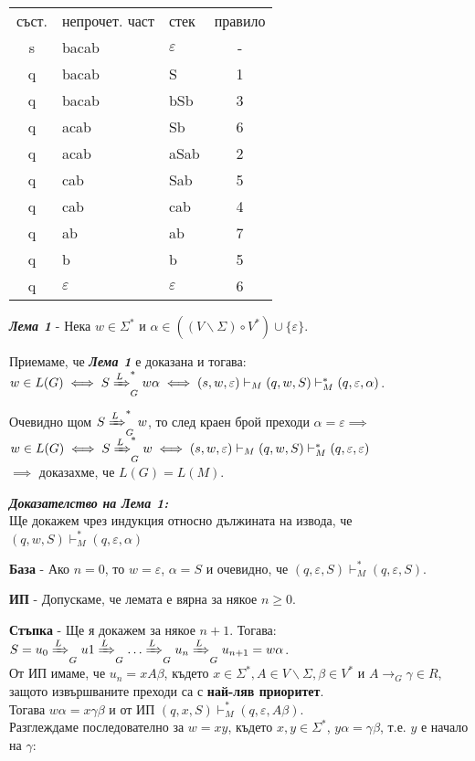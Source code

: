 \documentclass[fleqn,12pt]{article}
\begin{document}
\begin{flushleft}
\begin{tabular}{ |c|l|l|c| } 
\hline
съст. & непрочет. част & стек & правило \\ 
s & bacab & $\varepsilon$ & - \\
q & bacab & S & 1 \\
q & bacab & bSb & 3 \\
q & acab & Sb & 6 \\
q & acab & aSab & 2 \\
q & cab & Sab & 5 \\
q & cab & cab & 4 \\
q & ab & ab & 7 \\
q & b & b & 5 \\
q & $\varepsilon$ & $\varepsilon$ & 6 \\
\hline
\end{tabular}

\textit{\textbf{Лема 1}} - Нека $w \in \Sigma^*$ и $\alpha \in ((V \backslash \Sigma) \circ V^*) \cup \{\varepsilon\}$. 

Приемаме, че \textit{\textbf{Лема 1}} е доказана и тогава: \\
$w \in L(G) \iff S \xRightarrow[]{L}_G^* w\alpha \iff (s, w, \varepsilon) \vdash_M (q, w, S) \vdash_M^* (q, \varepsilon, \alpha)$.

Очевидно щом $S \xRightarrow[]{L}_G^* w$, то след краен брой преходи $\alpha = \varepsilon \implies$ \\
$w \in L(G) \iff S \xRightarrow[]{L}_G^* w \iff (s, w, \varepsilon) \vdash_M (q, w, S) \vdash_M^* (q, \varepsilon, \varepsilon)$ \\
$\implies$ доказахме, че $L(G) = L(M)$.

\textit{\textbf{Доказателство на Лема 1:}} \\

Ще докажем чрез индукция относно дължината на извода, че $(q, w, S) \vdash_M^* (q, \varepsilon, \alpha)$

\textbf{База} - Ако $n = 0$, то $w=\varepsilon$, $\alpha = S$ и очевидно, че $(q, \varepsilon, S) \vdash_M^* (q, \varepsilon, S)$.

\textbf{ИП} - Допускаме, че лемата е вярна за някое $n \geq 0$.

\textbf{Стъпка} - Ще я докажем за някое $n + 1$. Тогава: \\

$S = u_0 \xRightarrow[]{L}_G u1 \xRightarrow[]{L}_G \dots \xRightarrow[]{L}_G u_n \xRightarrow[]{L}_G u_{n+1} = w\alpha$. \\
От ИП имаме, че $u_n = xA\beta$, където $x \in \Sigma^*, A \in V \backslash \Sigma, \beta \in V^*$ и $A \to_G \gamma \in R$, защото извършваните преходи са с \textbf{най-ляв приоритет}. \\
Тогава $w\alpha = x\gamma\beta$ и от ИП $(q, x, S) \vdash_M^* (q, \varepsilon, A\beta)$. \\
Разглеждаме последователно за $w = xy$, където $x, y \in \Sigma^*$, $y\alpha = \gamma\beta$, т.е. $y$ е начало на $\gamma$: \\


\end{flushleft}
\end{document}
